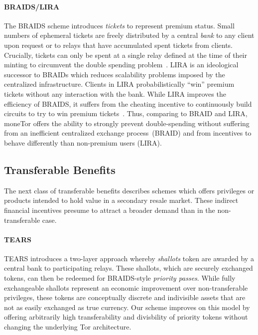 \paragraph*{BRAIDS/LIRA} The BRAIDS scheme introduces \emph{tickets} to represent
premium status. Small numbers of ephemeral tickets are freely distributed by a
central \emph{bank} to any client upon request or to relays that have
accumulated spent tickets from clients. Crucially, tickets can only be spent at
a single relay defined at the time of their minting to circumvent the double
spending problem~\cite{jansen2010recruiting}. LIRA is an ideological successor
to BRAIDs which reduces scalability problems imposed by the centralized
infrastructure. Clients in LIRA probabilistically ``win'' premium tickets
without any interaction with the bank. While LIRA improves the efficiency of
BRAIDS, it suffers from the cheating incentive to continuously build circuits to try to win premium tickets~\cite{jansen2013lira, jansenblogpost}. 
Thus, comparing to BRAID and LIRA, moneTor offers the ability to strongly prevent double-spending without suffering from an inefficient centralized exchange process~\cite{jansenblogpost}(BRAID) and from incentives to behave differently than non-premium users (LIRA).

\subsection{Transferable Benefits}

The next class of transferable benefits describes schemes which offers
privileges or products intended to hold value in a secondary resale market. These
indirect financial incentives presume to attract a broader demand than in the
non-transferable case.

\paragraph*{TEARS} TEARS introduces a two-layer approach whereby \emph{shallots}
token are awarded by a central bank to participating relays. These shallots,
which are securely exchanged tokens, can then be redeemed for BRAIDS-style
\emph{priority passes}. While fully exchangeable shallots represent an economic
improvement over non-transferable privileges, these tokens are conceptually
discrete and indivisible assets that are not as easily exchanged as true
currency. Our scheme improves on this model by offering arbitrarily high
transferability and divisbility of priority tokens without changing the
underlying Tor architecture.

